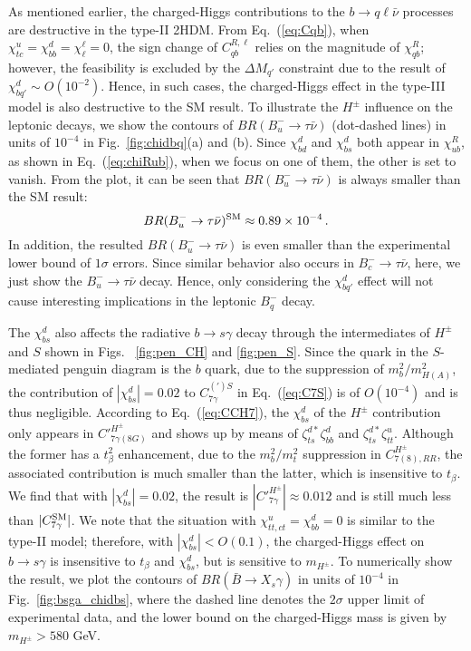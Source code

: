 \documentclass[prd,preprint,superscriptaddress,amsmath,amssymb]{revtex4}
\begin{document}
  As mentioned earlier, the charged-Higgs contributions to the $b\to q \ell \bar \nu$ processes are destructive in the type-II 2HDM.  From Eq.~(\ref{eq:Cqb}),  when $\chi^u_{tc}=\chi^d_{bb}=\chi^\ell_\ell=0$, the sign change of $C^{R,\ell}_{qb}$ relies on the magnitude of $\chi^R_{qb}$; however, the feasibility is excluded by the $\Delta M_{q'}$ constraint  due to the result of $\chi^d_{bq'}\sim O(10^{-2})$. Hence, in such cases, the charged-Higgs effect in the type-III model is also destructive to the SM result. To illustrate  the  $H^\pm$ influence   on the leptonic decays, we show the contours of $BR(B^-_u \to \tau \bar \nu)$ (dot-dashed lines) in units of $10^{-4}$ in Fig.~\ref{fig:chidbq}(a) and (b). Since $\chi^d_{bd}$ and $\chi^d_{bs}$ both appear in $\chi^R_{ub}$, as shown in Eq.~(\ref{eq:chiRub}), when we focus on one of them, the other is set to vanish. From the plot, it can be seen that  $BR(B^-_u \to \tau \bar\nu)$ is always smaller than the SM result:
  \begin{equation}
  BR(B^-_u \to \tau \bar \nu)^{\rm SM} \approx 0.89\times 10^{-4}\,.
  \end{equation}
 In addition,  the resulted $BR(B^-_u \to \tau \bar\nu)$ is even smaller than  the experimental lower bound of $1\sigma$ errors.  Since similar behavior also occurs in $B^-_c \to \tau \bar\nu$, here,  we just show the $B^-_u \to \tau \bar\nu$ decay. Hence, only considering the $\chi^d_{bq'}$ effect will not cause interesting implications in the leptonic $B^-_q$ decay.
  
  The $\chi^d_{bs}$ also affects the radiative $b \to s \gamma$ decay through the intermediates of   $H^\pm$ and $S$ shown in Figs.~ \ref{fig:pen_CH} and \ref{fig:pen_S}.  Since the quark in the $S$-mediated penguin diagram is the $b$ quark, due to the suppression of $m^2_b/m^2_{H(A)}$, the contribution of $|\chi^d_{bs}|=0.02$ to $C^{(\prime)S}_{7\gamma}$ in Eq.~(\ref{eq:C7S}) is  of $O(10^{-4})$ and is thus negligible. According to Eq.~(\ref{eq:CCH7}), the  $\chi^d_{bs}$ of  the $H^\pm$ contribution only appears in $C'^{H^\pm}_{7\gamma(8G)}$ and shows up by means of  $\zeta^{d*}_{ts} \zeta^d_{bb}$ and $\zeta^{d*}_{ts} \zeta^u_{tt}$. Although the former has a $t^2_\beta$ enhancement, due to the $m^2_b/m^2_t$ suppression in $C^{H^\pm}_{7(8),RR}$, the associated contribution is much smaller than the latter, which is insensitive to $t_\beta$. We find that with $|\chi^d_{bs}|=0.02$, the result is $|C'^{H^\pm}_{7\gamma}| \approx 0.012$ and is still much less than  $|C^{\rm SM}_{7\gamma}|$.  We note that the situation with $\chi^u_{tt,ct}=\chi^d_{bb}=0$ is similar to the type-II model; therefore, with $|\chi^d_{bs}| <  O(0.1)$, the charged-Higgs effect on $b\to s \gamma$ is insensitive to $t_\beta$ and $\chi^d_{bs}$, but is sensitive to $m_{H^\pm}$. To numerically show the result, we plot the contours of $BR(\bar B \to X_s \gamma)$ in units of $10^{-4}$  in Fig.~\ref{fig:bsga_chidbs}, where the dashed line denotes the $2\sigma$ upper limit of experimental data, and the lower bound on the charged-Higgs mass is  given by $m_{H^\pm} > 580$ GeV.
 
\end{document}
